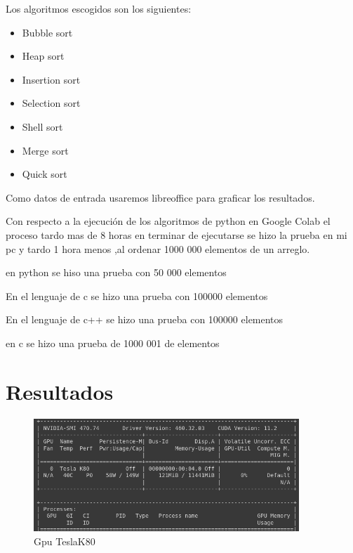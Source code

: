 \documentclass[a4paper]{article}
\begin{document}
Los algoritmos escogidos son los siguientes:

\begin{itemize}


\item  Bubble sort

\item Heap sort

\item Insertion sort

\item Selection sort

\item Shell sort

\item  Merge sort

\item Quick sort

\end{itemize}

Como datos de entrada usaremos libreoffice para graficar los resultados.

Con  respecto a la ejecución de los algoritmos de python  en Google Colab el proceso tardo mas de 8 horas en terminar de ejecutarse se hizo la prueba en mi pc y tardo 1 hora  menos ,al ordenar 1000 000 elementos de un arreglo.

en python se hiso una prueba con 50 000 elementos

En el lenguaje de c se hizo una prueba con 100000 elementos 

En el lenguaje de c++ se hizo una prueba con 100000 elementos 

en c se hizo una prueba de 1000 001 de elementos 











\section{Resultados}


\begin{figure}[H]%
\centering
\includegraphics[width=10cm]{imagenes/arq2.png}
\caption{Gpu TeslaK80}
\end{figure}
\end{document}
